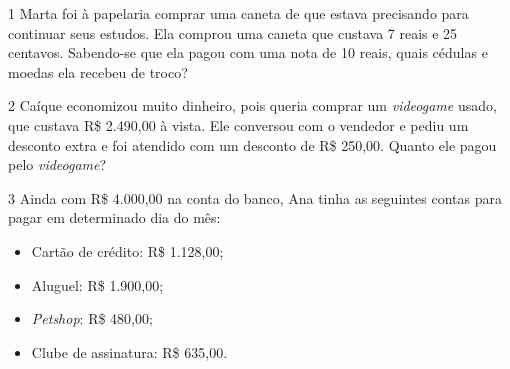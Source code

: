 

\num{1} Marta foi à papelaria comprar uma caneta de que estava precisando para
continuar seus estudos. Ela comprou uma caneta que custava 7 reais e 25
centavos. Sabendo-se que ela pagou com uma nota de 10 reais, quais
cédulas e moedas ela recebeu de troco?


\num{2} Caíque economizou muito dinheiro, pois queria comprar um \textit{videogame} usado,
que custava R\$ 2.490,00 à vista. Ele conversou com o vendedor e pediu
um desconto extra e foi atendido com um desconto de R\$ 250,00. Quanto
ele pagou pelo \textit{videogame}?


\num{3} Ainda com R\$ 4.000,00 na conta do banco, Ana tinha as seguintes contas para pagar em determinado dia do mês:

\begin{mdframed}[linewidth=2pt,linecolor=azul!20,backgroundcolor=azul!20,roundcorner=2pt]
\begin{itemize}
  \item Cartão de crédito: R\$ 1.128,00;
  \item Aluguel: R\$ 1.900,00;
  \item \textit{Petshop}: R\$ 480,00;
  \item Clube de assinatura: R\$ 635,00.
\end{itemize}
\end{mdframed}

